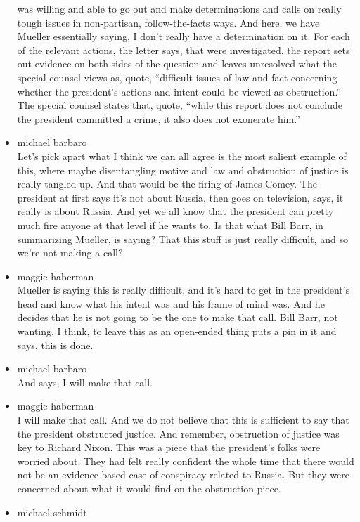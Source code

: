 \begin{itemize}
  was willing and able to go out and make determinations and calls on
  really tough issues in non-partisan, follow-the-facts ways. And here,
  we have Mueller essentially saying, I don't really have a
  determination on it. For each of the relevant actions, the letter
  says, that were investigated, the report sets out evidence on both
  sides of the question and leaves unresolved what the special counsel
  views as, quote, ``difficult issues of law and fact concerning whether
  the president's actions and intent could be viewed as obstruction.''
  The special counsel states that, quote, ``while this report does not
  conclude the president committed a crime, it also does not exonerate
  him.''
\item
  michael barbaro\\
  Let's pick apart what I think we can all agree is the most salient
  example of this, where maybe disentangling motive and law and
  obstruction of justice is really tangled up. And that would be the
  firing of James Comey. The president at first says it's not about
  Russia, then goes on television, says, it really is about Russia. And
  yet we all know that the president can pretty much fire anyone at that
  level if he wants to. Is that what Bill Barr, in summarizing Mueller,
  is saying? That this stuff is just really difficult, and so we're not
  making a call?
\item
  maggie haberman\\
  Mueller is saying this is really difficult, and it's hard to get in
  the president's head and know what his intent was and his frame of
  mind was. And he decides that he is not going to be the one to make
  that call. Bill Barr, not wanting, I think, to leave this as an
  open-ended thing puts a pin in it and says, this is done.
\item
  michael barbaro\\
  And says, I will make that call.
\item
  maggie haberman\\
  I will make that call. And we do not believe that this is sufficient
  to say that the president obstructed justice. And remember,
  obstruction of justice was key to Richard Nixon. This was a piece that
  the president's folks were worried about. They had felt really
  confident the whole time that there would not be an evidence-based
  case of conspiracy related to Russia. But they were concerned about
  what it would find on the obstruction piece.
\item
  michael schmidt\\

\end{itemize}
